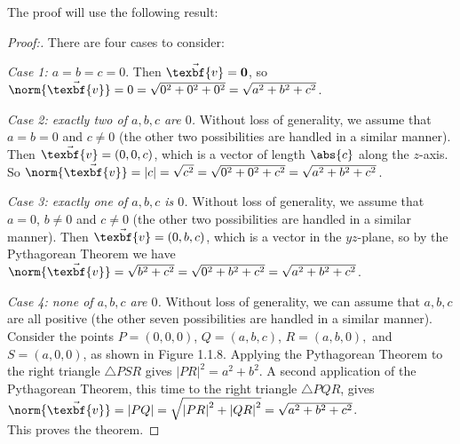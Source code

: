 The proof will use the following result:
\begin{proofbar}\vspace{-3mm}\begin{proof}[Proof:]
 There are four cases to consider:
 \par\noindent\emph{Case 1: $a = b = c = 0$}.  Then $\vec{\texbf{v}} = \textbf{0}$, so $\norm{\vec{\texbf{v}}}
 = 0 = \sqrt{0^2 + 0^2 + 0^2} = \sqrt{a^2 + b^2 + c^2}$.
 \vspace{3mm}
 \par\noindent\emph{Case 2: exactly two of $a, b, c$ are $0$.}  Without loss of generality, we assume that $a = b = 0$
 and $c \ne 0$ (the other two possibilities are handled in a similar manner).
 Then $\vec{\texbf{v}} = (0,0,c)$, which is a vector of length $\abs{c}$ along the $z$-axis.
 So $\norm{\vec{\texbf{v}}} = | c | = \sqrt{c^2} = \sqrt{0^2 + 0^2 + c^2} = \sqrt{a^2 + b^2 + c^2}$.
 \vspace{3mm}
 \par\noindent\emph{Case 3: exactly one of $a, b, c$ is $0$.}  Without loss of generality, we assume that $a = 0$,
 $b \ne 0$ and $c \ne 0$ (the other two possibilities are handled in a similar manner).
 Then $\vec{\texbf{v}} = (0,b,c)$, which is a vector in the $yz$-plane, so by the Pythagorean
 Theorem we have $\norm{\vec{\texbf{v}}} = \sqrt{b^2 + c^2} = \sqrt{0^2 + b^2 + c^2} =
 \sqrt{a^2 + b^2 + c^2}$.
 \vspace{1mm}
 \piccaption[]{}
 \par\noindent\emph{Case 4: none of $a, b, c$ are $0$.}  Without loss of generality, we can assume that
 $a, b, c$ are all positive (the other seven possibilities are handled in a similar manner).
 Consider the points $P = (0,0,0)$, $Q = (a,b,c)$, $R =(a,b,0),$ and $S = (a,0,0)$, as shown in Figure 1.1.8. Applying
 the Pythagorean Theorem to the right triangle $\triangle PSR$ gives $\left\vert PR \right\vert^2 = a^2 + b^2$. A second
 application of the Pythagorean Theorem, this time to the right triangle $\triangle PQR$, gives $\norm{\vec{\texbf{v}}}
 = \left\lvert PQ \right\rvert = \sqrt{\left\vert PR \right\vert^2 + \left\vert QR \right\vert^2} =
 \sqrt{a^2 + b^2 + c^2}$.\\
 This proves the theorem. \qquad \qedhere \vspace{-3mm}
\end{proof}\end{proofbar}
